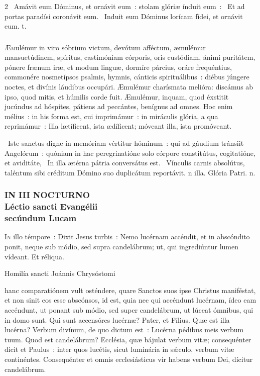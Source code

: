 \documentclass[9pt,twoside]{extarticle}
\begin{document}
\begin{multicols}{2}
~Amávit eum Dóminus, et ornávit eum~: stolam glóriæ índuit eum~: \textred{*}~Et ad portas paradísi coronávit eum. ~Induit eum Dóminus lorícam fídei, et ornávit eum. t.

\subsubsection*{\center \normalfont {}}
\lettrine{Æ}mulémur in viro sóbrium victum, devótum afféctum, æmulémur mansuetúdinem, spíritus, castimóniam córporis, oris custódiam, ánimi puritátem, pónere frænum iræ, et modum linguæ, dormíre párcius, oráre frequéntius, commonére nosmetípsos psalmis, hymnis, cánticis spirituálibus~: diébus júngere noctes, et divínis láudibus occupári. Æmulémur charísmata melióra: discámus ab ipso, quod mitis, et húmilis corde fuit. Æmulémur, inquam, quod éxstitit jucúndus ad hóspites, pátiens ad peccántes, benígnus ad omnes. Hoc enim mélius~: in his forma est, cui imprimámur~: in miráculis glória, a qua reprimámur~: Illa lætíficent, ista ædíficent; móveant illa, ista promóveant.

~Iste sanctus digne in memóriam vértitur hóminum~: qui ad gáudium tránsiit Angelórum~: quóniam in hac peregrinatióne solo córpore constitútus, cogitatióne, et aviditáte, \textred{*}~In illa ætérna pátria conversátus est. ~Vínculis carnis absolútus, taléntum sibi créditum Dómino suo duplicátum reportávit. n illa. Glória Patri. n.

\subsubsection*{\center \textsc{\small IN III NOCTURNO}\\ 
\normalfont Léctio sancti Evangélii\\ secúndum Lucam\\
}
\lettrine{I}n illo témpore~: Dixit Jesus turbis~: Nemo lucérnam accéndit, et in abscóndito ponit, neque sub módio, sed supra candelábrum; ut, qui ingrediúntur lumen vídeant. Et réliqua.

\begin{center}Homilía sancti Joánnis Chrysóstomi\\
\small {}\end{center}
 hanc comparatiónem vult osténdere, quare Sanctos suos ipse Christus maniféstat, et non sinit eos esse abscónsos, id est, quia nec qui accéndunt lucérnam, ídeo eam accéndunt, ut ponant sub módio, sed super candelábrum, ut lúceat ómnibus, qui in domo sunt. Qui sunt accensóres lucérnæ? Pater, et Fílius. Quæ est illa lucérna? Verbum divínum, de quo dictum est~: Lucérna pédibus meis verbum tuum. Quod est candelábrum? Ecclésia, quæ bájulat verbum vitæ; consequénter dicit et Paulus~: inter quos lucétis, sicut luminária in sǽculo, verbum vitæ continéntes. Consequénter et omnis ecclesiásticus vir habens verbum Dei, dícitur candelábrum.


\end{multicols}
\end{document}

